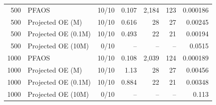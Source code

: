 \begin{table}[!htbp]
\begin{tabular}{r l r r r r r}
\hline
500 & PFAOS & 10/10 & 0.107 & 2,184 & 123 & 0.000186 \\
500 & Projected OE (M) & 10/10 & 0.616 & 28 & 27 & 0.00245 \\
500 & Projected OE (0.1M) & 10/10 & 0.493 & 22 & 21 & 0.00194 \\
500 & Projected OE (10M) & 0/10 & -- & -- & -- & 0.0515 \\
\hline
1000 & PFAOS & 10/10 & 0.108 & 2,039 & 124 & 0.000189 \\
1000 & Projected OE (M) & 10/10 & 1.13 & 28 & 27 & 0.00456 \\
1000 & Projected OE (0.1M) & 10/10 & 0.884 & 22 & 21 & 0.00348 \\
1000 & Projected OE (10M) & 0/10 & -- & -- & -- & 0.113 \\
\hline
\end{tabular}
\end{table}
